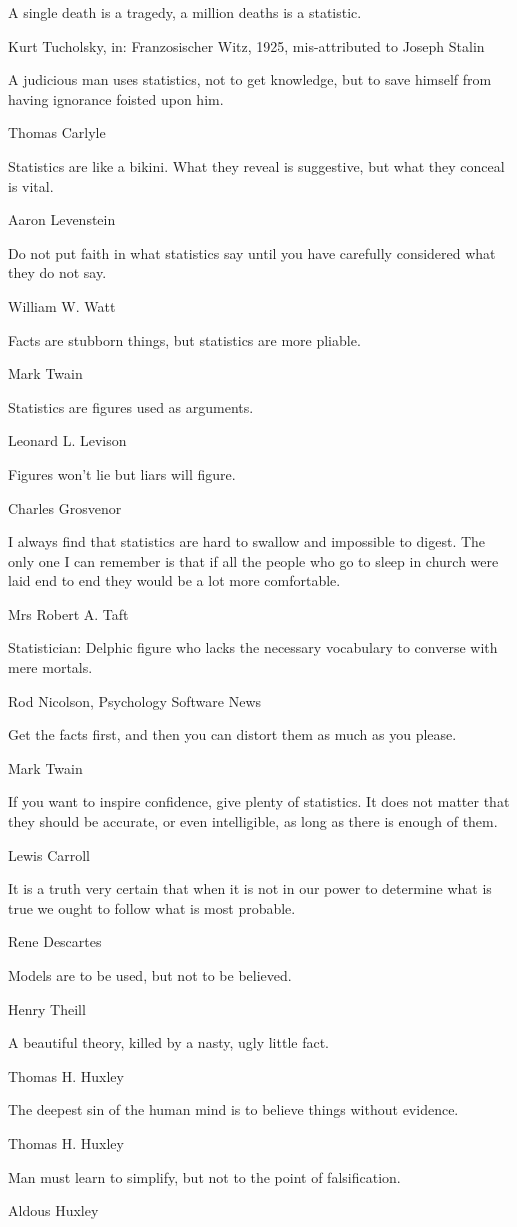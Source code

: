 \epigraph{A single death is a tragedy, a million deaths is a statistic.}{Kurt Tucholsky, in: Franzosischer Witz, 1925, mis-attributed to Joseph Stalin}

\epigraph{A judicious man uses statistics, not to get knowledge, but to save himself from having ignorance foisted upon him.}{Thomas Carlyle}

\epigraph{Statistics are like a bikini.  What they reveal is suggestive, but what they conceal is vital.}{Aaron Levenstein}

\epigraph{Do not put faith in what statistics say until you have carefully considered what they do not say.}{William W. Watt}

\epigraph{Facts are stubborn things, but statistics are more pliable.}{Mark Twain}

\epigraph{Statistics are figures used as arguments.}{Leonard L. Levison}

\epigraph{Figures won't lie but liars will figure.}{Charles Grosvenor}

\epigraph{I always find that statistics are hard to swallow and impossible to digest.  The only one I can remember is that if all the people who go to sleep in church were laid end to end they would be a lot more comfortable.}{Mrs Robert A. Taft}

\epigraph{Statistician: Delphic figure who lacks the necessary vocabulary to converse with mere mortals.}{Rod Nicolson, Psychology Software News}

\epigraph{Get the facts first, and then you can distort them as much as you please.}{Mark Twain}

\epigraph{If you want to inspire confidence, give plenty of statistics. It does not matter that they should be accurate, or even intelligible, as long as there is enough of them.}{Lewis Carroll}

\epigraph{It is a truth very certain that when it is not in our power to determine what is true we ought to follow what is most probable.}{Rene Descartes}

\epigraph{Models are to be used, but not to be believed.}{Henry Theill}

\epigraph{A beautiful theory, killed by a nasty, ugly little fact.}{Thomas H. Huxley}

\epigraph{The deepest sin of the human mind is to believe things without evidence.}{Thomas H. Huxley}

\epigraph{Man must learn to simplify, but not to the point of falsification.}{Aldous Huxley}

